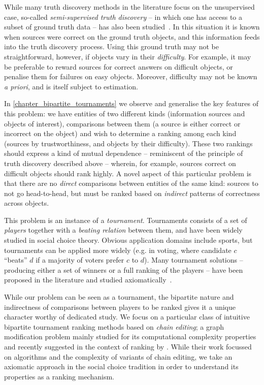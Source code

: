 While many truth discovery methods in the literature focus on the unsupervised
case, so-called \emph{semi-supervised truth discovery} -- in which one has
access to a subset of ground truth data -- has also been
studied~\cite{yin_supervised_2011,rekatsinas2017slimfast}. In this situation it
is known when sources were correct on the ground truth objects, and this
information feeds into the truth discovery process. Using this ground truth may
not be straightforward, however, if objects vary in their \emph{difficulty}.
For example, it may be preferable to reward sources for correct answers on
difficult objects, or penalise them for failures on easy objects. Moreover,
difficulty may not be known \emph{a priori}, and is itself subject to
estimation.

In \cref{chapter_bipartite_tournaments} we observe and generalise the key
features of this problem: we have entities of two different kinds (information
sources and objects of interest), comparisons between them (a source is either
correct or incorrect on the object) and wish to determine a ranking among each
kind (sources by trustworthiness, and objects by their difficulty). These two
rankings should express a kind of mutual dependence -- reminiscent of the
principle of truth discovery described above -- wherein, for example, sources
correct on difficult objects should rank highly. A novel aspect of this
particular problem is that there are no \emph{direct} comparisons between
entities of the same kind: sources to not go head-to-head, but must be ranked
based on \emph{indirect} patterns of correctness across objects.

This problem is an instance of a \emph{tournament}. Tournaments consists of a
set of \emph{players} together with a \emph{beating relation} between them, and
have been widely studied in social choice theory. Obvious application domains
include sports, but tournaments can be applied more widely (e.g. in voting,
where candidate $c$ ``beats'' $d$ if a majority of voters prefer $c$ to $d$).
Many tournament solutions -- producing either a set of winners or a full
ranking of the players -- have been proposed in the literature and studied
axiomatically~\cite{gonzalez2014paired,brandt2016a}.

While our problem can be seen as a tournament, the bipartite nature and
indirectness of comparisons between players to be ranked gives it a unique
character worthy of dedicated study. We focus on a particular class of
intuitive bipartite tournament ranking methods based on \emph{chain editing}; a
graph modification problem mainly studied for its computational complexity
properties~\cite{yannakakis1981computing} and recently suggested in the context
of ranking by \textcite{jiao2017algorithms}. While their work focussed on
algorithms and the complexity of variants of chain editing, we take an
axiomatic approach in the social choice tradition in order to understand its
properties as a ranking mechanism.


